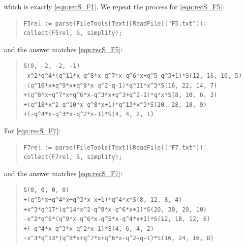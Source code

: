 \documentclass[ALCO,Unicode,published]{cedram}
\begin{document}
which is exactly \eqref{eqn:recS_F1}.
We repeat the process for \eqref{eqn:recS_F5}:
\begin{quote}
\begin{verbatim}
F5rel := parse(FileTools[Text][ReadFile]("F5.txt")):
collect(F5rel, S, simplify);
\end{verbatim}
\end{quote}
and the answer matches \eqref{eqn:recS_F5}:
\begin{quote}
\begin{verbatim}
S(0, -2, -2, -1)
-x^2*q^4*(q^11*x-q^8*x-q^7*x-q^6*x+q^5-q^3+1)*S(12, 16, 10, 5)
-(q^10*x+q^9*x+q^8*x-q^2-q-1)*q^11*x^3*S(16, 22, 14, 7)
+(q^8*x+q^7*x+q^6*x-q^3*x+q^3+q^2-1)*q*x*S(8, 10, 6, 3)
+(q^18*x^2-q^10*x-q^8*x+1)*q^13*x^3*S(20, 28, 18, 9)
+(-q^4*x-q^3*x-q^2*x-1)*S(4, 4, 2, 1)
\end{verbatim}
\end{quote}
For \eqref{eqn:recS_F7}:
\begin{quote}
\begin{verbatim}
F7rel := parse(FileTools[Text][ReadFile]("F7.txt")):
collect(F7rel, S, simplify);
\end{verbatim}
\end{quote}
and the answer matches \eqref{eqn:recS_F7}:
\begin{quote}
\begin{verbatim}
S(0, 0, 0, 0)
+(q^5*x+q^4*x+q^3*x-x+1)*q^4*x*S(8, 12, 8, 4)
+x^3*q^17*(q^14*x^2-q^8*x-q^6*x+1)*S(20, 30, 20, 10)
-x^2*q^6*(q^9*x-q^6*x-q^5*x-q^4*x+1)*S(12, 18, 12, 6)
+(-q^4*x-q^3*x-q^2*x-1)*S(4, 6, 4, 2)
-x^3*q^13*(q^8*x+q^7*x+q^6*x-q^2-q-1)*S(16, 24, 16, 8)
\end{verbatim}
\end{quote}








\end{document}
